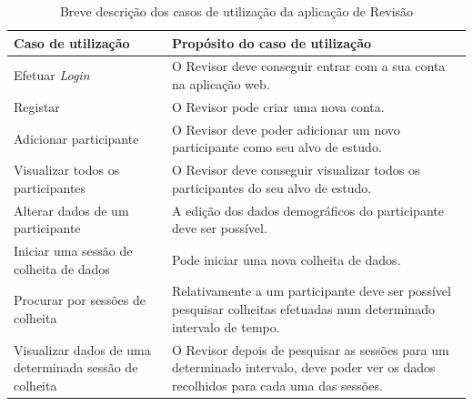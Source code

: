 \begin{table}[H]
\centering

\begin{tabularx}{1\textwidth}{|p{4cm}|p{10.7cm}|}
\rowcolor[HTML]{FFCE93} \hline
{\color[HTML]{000000} \textbf{Caso de utilização}} & {\color[HTML]{000000} \textbf{Propósito do caso de utilização}}  \\
\hline
Efetuar \textit{Login} & O Revisor deve conseguir entrar com a sua conta na aplicação web. \\ \hline

Registar & O Revisor pode criar uma nova  conta. \\ \hline

Adicionar participante & O Revisor deve poder adicionar um novo participante como seu alvo de estudo.\\ \hline

Visualizar todos os participantes & O Revisor deve conseguir visualizar todos os participantes do seu alvo de estudo. \\ \hline

Alterar dados de um participante & A edição dos dados demográficos do participante deve ser possível. \\ \hline

Iniciar uma sessão de colheita de dados  & Pode iniciar uma nova colheita de dados. \\ \hline

Procurar por sessões de colheita & Relativamente a um participante deve ser possível  pesquisar colheitas efetuadas num determinado intervalo de tempo. \\ \hline

Visualizar dados de uma determinada sessão de colheita & O Revisor depois de pesquisar as sessões para um determinado intervalo, deve poder ver os dados recolhidos para cada uma das sessões. \\ \hline                        
\end{tabularx}

\caption{Breve descrição dos casos de utilização da aplicação de Revisão}
\label{t:web-usecase}
\end{table}

\cleardoublepage